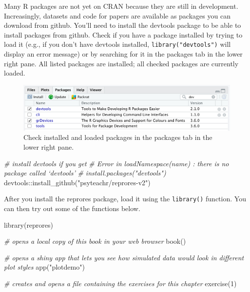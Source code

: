 \documentclass[
  oneside]{book}
\newenvironment{Shaded}{\begin{snugshade}}{\end{snugshade}}
\newcommand{\CommentTok}[1]{\textcolor[rgb]{0.56,0.35,0.01}{\textit{#1}}}
\newcommand{\DecValTok}[1]{\textcolor[rgb]{0.00,0.00,0.81}{#1}}
\newcommand{\FunctionTok}[1]{\textcolor[rgb]{0.00,0.00,0.00}{#1}}
\newcommand{\NormalTok}[1]{#1}
\newcommand{\SpecialCharTok}[1]{\textcolor[rgb]{0.00,0.00,0.00}{#1}}
\newcommand{\StringTok}[1]{\textcolor[rgb]{0.31,0.60,0.02}{#1}}
\begin{document}
Many R packages are not yet on CRAN because they are still in development. Increasingly, datasets and code for papers are available as packages you can download from github. You'll need to install the devtools package to be able to install packages from github. Check if you have a package installed by trying to load it (e.g., if you don't have devtools installed, \texttt{library("devtools")} will display an error message) or by searching for it in the packages tab in the lower right pane. All listed packages are installed; all checked packages are currently loaded.

\begin{figure}

{\centering \includegraphics[width=1\linewidth]{images/01/packages} 

}

\caption{Check installed and loaded packages in the packages tab in the lower right pane.}\label{fig:img-packages}
\end{figure}

\begin{Shaded}
\begin{Highlighting}[]
\CommentTok{\# install devtools if you get}
\CommentTok{\# Error in loadNamespace(name) : there is no package called ‘devtools’}
\CommentTok{\# install.packages("devtools")}
\NormalTok{devtools}\SpecialCharTok{::}\FunctionTok{install\_github}\NormalTok{(}\StringTok{"psyteachr/reprores{-}v2"}\NormalTok{)}
\end{Highlighting}
\end{Shaded}

After you install the reprores package, load it using the \texttt{library()} function. You can then try out some of the functions below.

\begin{Shaded}
\begin{Highlighting}[]
\FunctionTok{library}\NormalTok{(reprores)}

\CommentTok{\# opens a local copy of this book in your web browser}
\FunctionTok{book}\NormalTok{()}

\CommentTok{\# opens a shiny app that lets you see how simulated data would look in different plot styles}
\FunctionTok{app}\NormalTok{(}\StringTok{"plotdemo"}\NormalTok{)}

\CommentTok{\# creates and opens a file containing the exercises for this chapter}
\FunctionTok{exercise}\NormalTok{(}\DecValTok{1}\NormalTok{)}
\end{Highlighting}
\end{Shaded}
\end{document}
